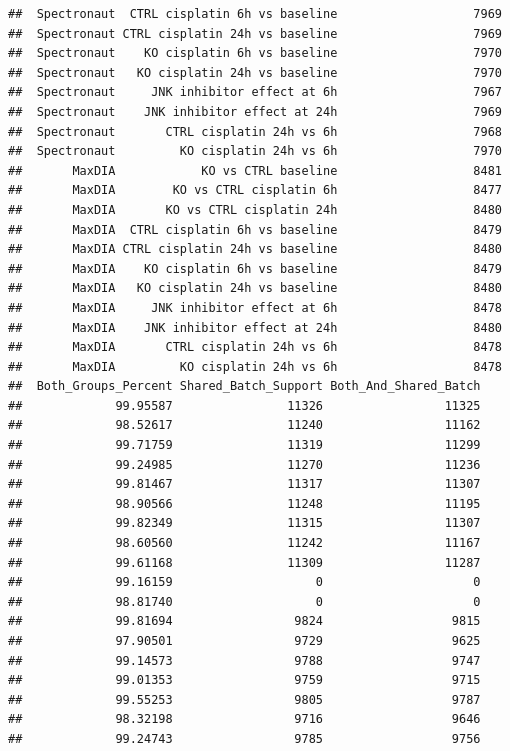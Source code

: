 \documentclass[
  10pt,
]{article}
\begin{document}
\begin{verbatim}
##  Spectronaut  CTRL cisplatin 6h vs baseline                   7969
##  Spectronaut CTRL cisplatin 24h vs baseline                   7969
##  Spectronaut    KO cisplatin 6h vs baseline                   7970
##  Spectronaut   KO cisplatin 24h vs baseline                   7970
##  Spectronaut     JNK inhibitor effect at 6h                   7967
##  Spectronaut    JNK inhibitor effect at 24h                   7969
##  Spectronaut       CTRL cisplatin 24h vs 6h                   7968
##  Spectronaut         KO cisplatin 24h vs 6h                   7970
##       MaxDIA            KO vs CTRL baseline                   8481
##       MaxDIA        KO vs CTRL cisplatin 6h                   8477
##       MaxDIA       KO vs CTRL cisplatin 24h                   8480
##       MaxDIA  CTRL cisplatin 6h vs baseline                   8479
##       MaxDIA CTRL cisplatin 24h vs baseline                   8480
##       MaxDIA    KO cisplatin 6h vs baseline                   8479
##       MaxDIA   KO cisplatin 24h vs baseline                   8480
##       MaxDIA     JNK inhibitor effect at 6h                   8478
##       MaxDIA    JNK inhibitor effect at 24h                   8480
##       MaxDIA       CTRL cisplatin 24h vs 6h                   8478
##       MaxDIA         KO cisplatin 24h vs 6h                   8478
##  Both_Groups_Percent Shared_Batch_Support Both_And_Shared_Batch
##             99.95587                11326                 11325
##             98.52617                11240                 11162
##             99.71759                11319                 11299
##             99.24985                11270                 11236
##             99.81467                11317                 11307
##             98.90566                11248                 11195
##             99.82349                11315                 11307
##             98.60560                11242                 11167
##             99.61168                11309                 11287
##             99.16159                    0                     0
##             98.81740                    0                     0
##             99.81694                 9824                  9815
##             97.90501                 9729                  9625
##             99.14573                 9788                  9747
##             99.01353                 9759                  9715
##             99.55253                 9805                  9787
##             98.32198                 9716                  9646
##             99.24743                 9785                  9756

\end{verbatim}
\end{document}

